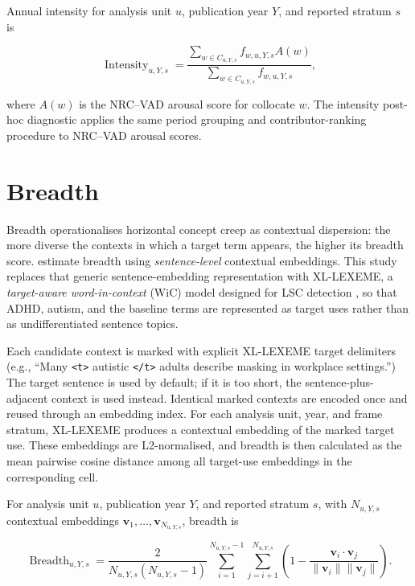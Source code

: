 Annual intensity for analysis unit \(u\), publication year \(Y\), and reported stratum \(s\) is

\begin{equation}
\operatorname{Intensity}_{u,Y,s}
=
\frac{
\sum_{w \in C_{u,Y,s}} f_{w,u,Y,s} A(w)
}{
\sum_{w \in C_{u,Y,s}} f_{w,u,Y,s}
},
\end{equation}

\noindent where \(A(w)\) is the NRC--VAD arousal score for collocate \(w\). The intensity post-hoc diagnostic applies the same period grouping and contributor-ranking procedure to NRC--VAD arousal scores.

\section{Breadth}

Breadth operationalises horizontal concept creep as contextual dispersion: the more diverse the contexts in which a target term appears, the higher its breadth score. \citet{baesMultidimensionalFrameworkEvaluating2024} estimate breadth using \textit{sentence-level} contextual embeddings. This study replaces that generic sentence-embedding representation with XL-LEXEME, a \textit{target-aware word-in-context} (WiC) model designed for LSC detection \citep{cassottiXLLEXEMEWiCPretrained2023}, so that ADHD, autism, and the baseline terms are represented as target uses rather than as undifferentiated sentence topics.

Each candidate context is marked with explicit XL-LEXEME target delimiters (e.g., ``Many \texttt{<t>} autistic \texttt{</t>} adults describe masking in workplace settings.'') The target sentence is used by default; if it is too short, the sentence-plus-adjacent context is used instead. Identical marked contexts are encoded once and reused through an embedding index. For each analysis unit, year, and frame stratum, XL-LEXEME produces a contextual embedding of the marked target use. These embeddings are L2-normalised, and breadth is then calculated as the mean pairwise cosine distance among all target-use embeddings in the corresponding cell.

For analysis unit \(u\), publication year \(Y\), and reported stratum \(s\), with \(N_{u,Y,s}\) contextual embeddings \(\mathbf{v}_1,\ldots,\mathbf{v}_{N_{u,Y,s}}\), breadth is

\begin{equation}
\operatorname{Breadth}_{u,Y,s}
=
\frac{2}{N_{u,Y,s}(N_{u,Y,s}-1)}
\sum_{i=1}^{N_{u,Y,s}-1}
\sum_{j=i+1}^{N_{u,Y,s}}
\left(
1 -
\frac{\mathbf{v}_i \cdot \mathbf{v}_j}
{\lVert \mathbf{v}_i \rVert \lVert \mathbf{v}_j \rVert}
\right).
\end{equation}

